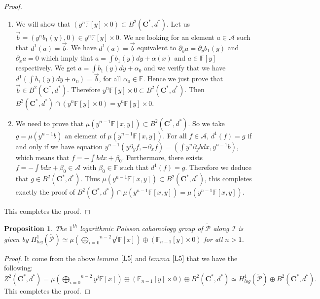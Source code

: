 \documentclass[a4paper, 12pt,oneside,reqno]{amsart}
\newtheorem{proposition}[theorem]{Proposition}
\theoremstyle{definition}
\begin{document}
   \begin{proof} $\label{PP}$\\
\begin{enumerate}
\item[1.]     We will  show that $ (y^{n} \mathbb{F}[y]\times 0 ) \subset B^{2}(\textbf{C}^{*},d^{*})$. Let us $\overrightarrow{b}=(y^n b_{1}(y), 0) \in y^{n} \mathbb{F}[y]\times 0$. We are looking for an element $a\in \mathcal{A}$ such that $d^1(a)= \overrightarrow{b}$. We have $d^1(a)= \overrightarrow{b}$ equivalent to $\partial_{y}a = \partial_{y}b_{1}(y) $ and $\partial_{x}a = 0$ which imply  that $a = \int b_{1}(y)dy + \alpha(x)$ and $a\in  \mathbb{F}[y]$ respectively. We get  $a = \int b_{1}(y)dy + \alpha_{0}$ and we verify that we have $d^1\left(\int b_{1}(y)dy + \alpha_{0}\right)= \overrightarrow{b}$, for all $\alpha_{0}\in \mathbb{F}$. Hence we just prove that $\overrightarrow{b}\in B^{2}(\textbf{C}^{*},d^{*})$. Therefore $y^{n} \mathbb{F}[y]\times 0  \subset B^{2}(\textbf{C}^{*},d^{*})$. Then $    B^{2}(\textbf{C}^{*},d^{*}) \cap( y^{n} \mathbb{F}[y]\times 0 )= y^{n} \mathbb{F}[y]\times 0 $. 
 \item[2.] We need to prove that $\mu(y^{n-1} \mathbb{F}[x,y] )\subset  B^{2}(\textbf{C}^{*},d^{*})$. So we take $ g = \mu(y^{n-1}b)$ an element of $ \mu\left(y^{n-1}\mathbb{F}[x,y]\right) $. For all $f\in \mathcal{A}$, $d^1(f)=g $ if and only if we have equation $y^{n-1}(y\partial_{y}f, -\partial_{x}f) = \left( \int y^{n}\partial_{y}bdx, y^{n-1}b\right)$, which means that $f=-\int bdx + \beta_{0}$. Furthermore, there exists $f=-\int bdx + \beta_{0}\in \mathcal{A}$ with $\beta_{0}\in \mathbb{F}$ such that $d^1(f)=g$. Therefore we deduce that $g\in B^{2}(\textbf{C}^{*},d^{*})$. Thus $\mu(y^{n-1} \mathbb{F}[x,y] )\subset  B^{2}(\textbf{C}^{*},d^{*})$, this completes exactly the proof of $B^{2}(\textbf{C}^{*},d^{*}) \cap \mu(y^{n-1} \mathbb{F}[x,y] )  =  \mu(y^{n-1} \mathbb{F}[x,y] )$.
\end{enumerate}
This completes the proof.
   \end{proof}
  
  \begin{proposition} 
  The  $1^{th}$  logarithmic Poisson cohomology group of $\tilde{\mathcal{P}}$ along $\mathcal{I}$ is given by
  $H_{log}^{1}(\tilde{\mathcal{P}}) \simeq  \mu (\overset{n-2}{\underset{i=0}{\bigoplus}}y^{i} \mathbb{F}[x])\oplus ( \mathbb{F}_{n-1}[y]\times 0)$ for all $n>1$.
    \end{proposition} 
\begin{proof}
It come from  the above $lemma$ $\ref{L5}$ and $lemma$ $\ref{L5}$ that we have the following:\\
 $Z^{2}(\textbf{C}^{*},d^{*})  = \mu (\overset{n-2}{\underset{i=0}{\bigoplus}}y^{j} \mathbb{F}[x] )\oplus  (\mathbb{F}_{n-1}[y]\times 0 )\oplus B^{2}(\textbf{C}^{*},d^{*})\simeq H_{log}^{1}(\tilde{\mathcal{P}}) \oplus B^{2}(\textbf{C}^{*},d^{*}).$ 
 This completes the proof.
\end{proof} 
  
\end{document}
